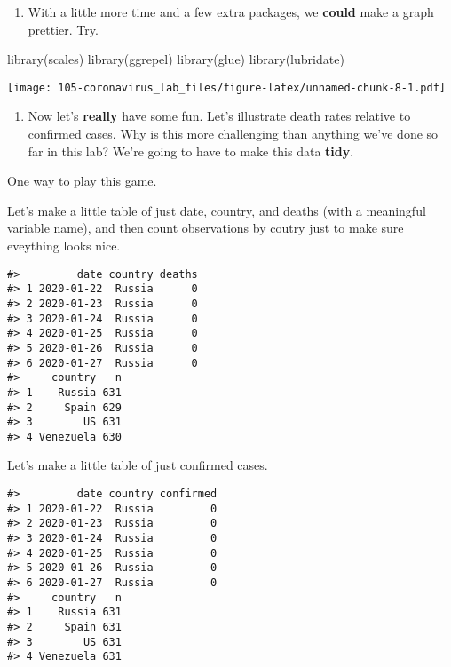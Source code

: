\documentclass[
]{book}
\newenvironment{Shaded}{\begin{snugshade}}{\end{snugshade}}
\newcommand{\FunctionTok}[1]{\textcolor[rgb]{0.00,0.00,0.00}{#1}}
\newcommand{\NormalTok}[1]{#1}
\providecommand{\tightlist}{%
  \setlength{\itemsep}{0pt}\setlength{\parskip}{0pt}}
\begin{document}
\begin{enumerate}
\def\labelenumi{\arabic{enumi}.}
\setcounter{enumi}{5}
\tightlist
\item
  With a little more time and a few extra packages, we \textbf{could} make a graph prettier. Try.
\end{enumerate}

\begin{Shaded}
\begin{Highlighting}[]
\FunctionTok{library}\NormalTok{(scales)}
\FunctionTok{library}\NormalTok{(ggrepel)}
\FunctionTok{library}\NormalTok{(glue)}
\FunctionTok{library}\NormalTok{(lubridate)}
\end{Highlighting}
\end{Shaded}

\texttt{[image: 105-coronavirus\_lab\_files/figure-latex/unnamed-chunk-8-1.pdf]}

\begin{enumerate}
\def\labelenumi{\arabic{enumi}.}
\setcounter{enumi}{6}
\tightlist
\item
  Now let's \textbf{really} have some fun. Let's illustrate death rates relative to confirmed cases. Why is this more challenging than anything we've done so far in this lab? We're going to have to make this data \textbf{tidy}.
\end{enumerate}

One way to play this game.

Let's make a little table of just date, country, and deaths (with a meaningful variable name), and then count observations by coutry just to make sure eveything looks nice.

\begin{verbatim}
#>         date country deaths
#> 1 2020-01-22  Russia      0
#> 2 2020-01-23  Russia      0
#> 3 2020-01-24  Russia      0
#> 4 2020-01-25  Russia      0
#> 5 2020-01-26  Russia      0
#> 6 2020-01-27  Russia      0
#>     country   n
#> 1    Russia 631
#> 2     Spain 629
#> 3        US 631
#> 4 Venezuela 630
\end{verbatim}

Let's make a little table of just confirmed cases.

\begin{verbatim}
#>         date country confirmed
#> 1 2020-01-22  Russia         0
#> 2 2020-01-23  Russia         0
#> 3 2020-01-24  Russia         0
#> 4 2020-01-25  Russia         0
#> 5 2020-01-26  Russia         0
#> 6 2020-01-27  Russia         0
#>     country   n
#> 1    Russia 631
#> 2     Spain 631
#> 3        US 631
#> 4 Venezuela 631
\end{verbatim}
\end{document}
